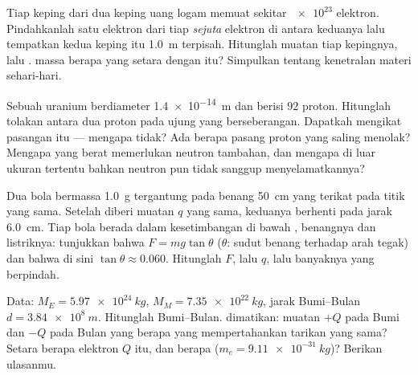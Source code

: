 \begin{exercise}[$\star\star$]\label{exo:g11:fundamental-interactions:11}
Tiap keping dari dua keping uang logam memuat sekitar $\num{e23}$
elektron. Pindahkanlah satu elektron dari tiap \emph{sejuta} elektron di
antara keduanya lalu tempatkan kedua keping itu \qty{1.0}{m} terpisah.
Hitunglah muatan tiap kepingnya, lalu .  massa berapa yang
setara dengan  itu? Simpulkan tentang kenetralan materi
sehari-hari.
\end{exercise}

\begin{exercise}[$\star\star\star$]\label{exo:g11:fundamental-interactions:12}
Sebuah  uranium berdiameter \qty{1.4e-14}{m} dan berisi $92$
proton. Hitunglah tolakan antara dua proton pada ujung yang
berseberangan. Dapatkah  mengikat pasangan itu --- mengapa
tidak? Ada berapa pasang proton yang saling menolak? Mengapa 
yang berat memerlukan neutron tambahan, dan mengapa di luar ukuran
tertentu bahkan neutron pun tidak sanggup menyelamatkannya?
\end{exercise}

\begin{exercise}[$\star\star\star$]\label{exo:g11:fundamental-interactions:13}
Dua bola bermassa \qty{1.0}{g} tergantung pada benang \qty{50}{cm} yang
terikat pada titik yang sama. Setelah diberi muatan $q$ yang sama,
keduanya berhenti pada jarak \qty{6.0}{cm}. Tiap bola berada dalam
kesetimbangan di bawah ,  benangnya dan 
listriknya: tunjukkan bahwa $F = mg\tan\theta$ ($\theta$: sudut benang
terhadap arah tegak) dan bahwa di sini $\tan\theta \approx 0.060$.
Hitunglah $F$, lalu $q$, lalu banyaknya  yang berpindah.
\end{exercise}

\begin{exercise}[$\star\star\star$]\label{exo:g11:fundamental-interactions:14}
Data: $M_E = \qty{5.97e24}{kg}$, $M_M = \qty{7.35e22}{kg}$, jarak
Bumi--Bulan $d = \qty{3.84e8}{m}$. Hitunglah 
Bumi--Bulan.  dimatikan: muatan $+Q$ pada Bumi dan $-Q$
pada Bulan yang berapa yang mempertahankan tarikan yang sama? Setara
berapa elektron $Q$ itu, dan berapa 
($m_e = \qty{9.11e-31}{kg}$)? Berikan ulasanmu.
\end{exercise}

